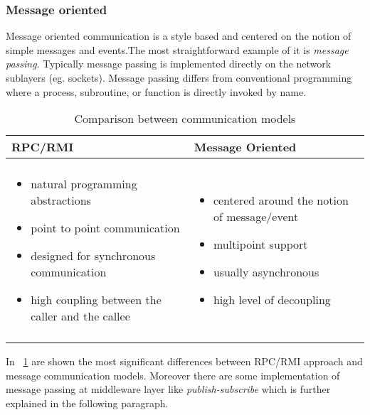 \subsubsection{Message oriented} Message oriented communication is a style based and centered on the notion of simple messages and events.The most straightforward example of it is \textit{message passing}. Typically message passing is implemented directly on the network sublayers (eg. sockets). Message passing differs from conventional programming where a process, subroutine, or function is directly invoked by name. 
\begin{table}[h]
	\caption{Comparison between communication models}
	\label{tab:comp}
	\centering
	\begin{tabular}{p{}p{}}
		\toprule
		\textbf{RPC/RMI} & \textbf{Message Oriented} \\
		\midrule
		& \\
	      \begin{minipage}[t]{0.45\textwidth}
	     	\begin{itemize}
	     		\item natural programming abstractions
	     		\item point to point communication
	     		\item designed for synchronous communication
	     		\item high coupling between the caller and the callee
	     	\end{itemize}
	     \end{minipage} &  \begin{minipage}[t]{0.45\textwidth}
	     \begin{itemize}
	     	\item centered around the notion of message/event
	     	\item multipoint support
	     	\item usually asynchronous
	     	\item high level of decoupling
	     \end{itemize}
     \end{minipage} \\
  & \\
		
		\bottomrule
	\end{tabular}
\end{table}
In \tablename~\ref{tab:comp} are shown the most significant differences between RPC/RMI approach and message communication models. Moreover there are some implementation of message passing at middleware layer like \textit{publish-subscribe} which is further explained in the following paragraph.

